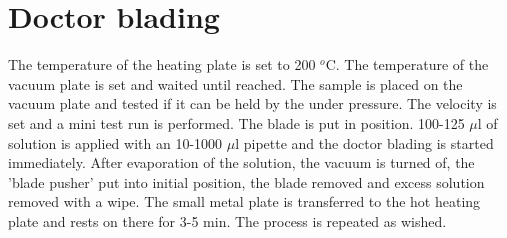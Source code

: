 \documentclass[a4paper]{article}
\begin{document}
\section{Doctor blading}
The temperature of the heating plate is set to 200 $^o$C.
The temperature of the vacuum plate is set and waited until reached.
The sample is placed on the vacuum plate and tested if it can be held by the under pressure.
The velocity is set and a mini test run is performed. 
The blade is put in position. 
100-125 $\mu$l of solution is applied with an 10-1000 $\mu$l pipette and the doctor blading is started immediately. 
After evaporation of the solution, the vacuum is turned of, the 'blade pusher' put into initial position, the blade removed and excess solution removed with a wipe. 
The small metal plate is transferred to the hot heating plate and rests on there for 3-5 min. 
The process is repeated as wished. 



\end{document}
